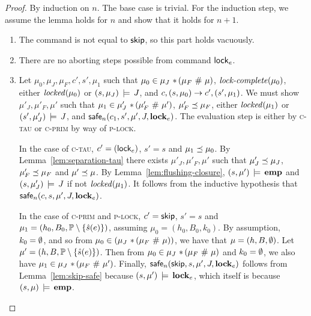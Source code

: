 \documentclass[11pt]{report}
\begin{document}
\begin{proof}
  By induction on $n$. The base case is trivial. For the induction step, we assume the lemma holds for $n$ and show that it holds for $n+1$.

    \begin{enumerate}
        \item The command is not equal to $\operatorname{\mathsf{skip}}$, so this part holds vacuously. 

        \item There are no aborting steps possible from command $\operatorname{\mathsf{lock}}_e$. 

        \item Let $\mu_0,\mu_J,\mu_F,c',s',\mu_1$ such that $\mu_0 \in \mu_J \operatorname{\,\ast\,} (\mu_F \operatorname{\,\#\,} \mu)$, $\text{\textit{lock-complete}}(\mu_0)$, either $\mathit{locked}(\mu_0)$ or $(s,\mu_J) \,\models\, J$, and $c,(s,\mu_0) \rightarrow c',(s',\mu_1)$. We must show $\mu'_J,\mu'_F,\mu'$ such that $\mu_1 \in \mu'_J \operatorname{\,\ast\,} (\mu'_F \operatorname{\,\#\,} \mu')$, $\mu'_F \preceq \mu_F$, either $\mathit{locked}(\mu_1)$ or $(s',\mu'_J) \,\models\, J$, and $\mathsf{safe}_{n}(c_1,s',\mu',J,\mathbf{lock}_{e})$. The evaluation step is either by \textsc{c-tau} or \textsc{c-prim} by way of \textsc{p-lock}. 

        In the case of \textsc{c-tau}, $c' = (\operatorname{\mathsf{lock}}_{e})$, $s' = s$ and $\mu_1 \preceq \mu_0$. By Lemma~\ref{lem:separation-tau} there exists $\mu'_J,\mu'_F,\mu'$ such that $\mu'_J \preceq \mu_J$, $\mu'_F \preceq \mu_F$ and $\mu' \preceq \mu$. By Lemma~\ref{lem:flushing-closure}, $(s,\mu') \,\models\, \mathbf{emp}$ and $(s,\mu'_J) \,\models\, J$ if not $\mathit{locked}(\mu_1)$. It follows from the inductive hypothesis that $\mathsf{safe}_{n}(c,s,\mu',J,\mathbf{lock}_{e})$. 

        In the case of \textsc{c-prim} and \textsc{p-lock}, $c' = \operatorname{\mathsf{skip}}$, $s' = s$ and $\mu_1 = (h_0,B_0,\mathbb{P} \setminus \left\lbrace \hat{s}(e) \right\rbrace)$, assuming $\mu_0 = (h_0,B_0,k_0)$. By assumption, $k_0 = \operatorname{\emptyset}$, and so from $\mu_0  \in (\mu_J \operatorname{\,\ast\,} (\mu_F \operatorname{\,\#\,} \mu))$, we have that $\mu = (h,B,\operatorname{\emptyset})$. Let $\mu' = (h,B,\mathbb{P} \setminus \left\lbrace \hat{s}(e) \right\rbrace)$. Then from $\mu_0 \in \mu_J \operatorname{\,\ast\,} (\mu_F \operatorname{\,\#\,} \mu)$ and $k_0 = \operatorname{\emptyset}$, we also have $\mu_1 \in \mu_J \operatorname{\,\ast\,} (\mu_F \operatorname{\,\#\,} \mu')$. Finally, $\mathsf{safe}_{n}(\operatorname{\mathsf{skip}},s,\mu',J,\mathbf{lock}_{e})$ follows from Lemma~\ref{lem:skip-safe} because $(s,\mu') \,\models\, \mathbf{lock}_{e}$, which itself is because $(s,\mu) \,\models\, \mathbf{emp}$.  

    \end{enumerate}
\end{proof}
\end{document}
